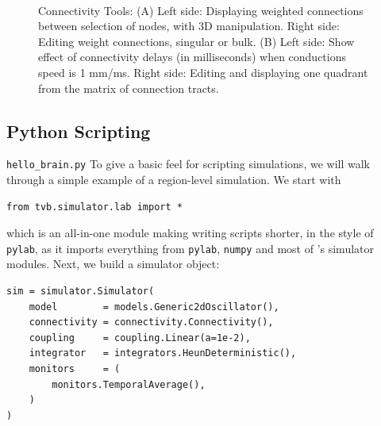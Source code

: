  \begin{figure}[!htbp]
    \centering
    \\
    \caption{Connectivity Tools: 
    (A) Left side: Displaying weighted connections between selection of nodes, with 3D manipulation.
    Right side: Editing weight connections, singular or bulk.
    (B) Left side: Show effect of connectivity delays (in milliseconds) when conductions speed is 1 mm/ms.
    Right side: Editing and displaying one quadrant from the matrix of connection tracts.}
        \label{fig:connectivity}
\end{figure}



\subsection{Python Scripting}

\texttt{hello\_brain.py}
To give a basic feel for scripting \TVB simulations, we will 
walk through a simple example of a region-level simulation. We 
start with

\begin{lstlisting}
from tvb.simulator.lab import *
\end{lstlisting}

\noindent which is an all-in-one module making writing scripts
shorter, in the style of \texttt{pylab}, as it imports everything
from \texttt{pylab}, \texttt{numpy} and most of \TVB's simulator
modules. Next, we build a simulator object:

\begin{lstlisting}
sim = simulator.Simulator(
    model        = models.Generic2dOscillator(), 
    connectivity = connectivity.Connectivity(),
    coupling     = coupling.Linear(a=1e-2),
    integrator   = integrators.HeunDeterministic(),
    monitors     = (
        monitors.TemporalAverage(), 
    )
)
\end{lstlisting}

